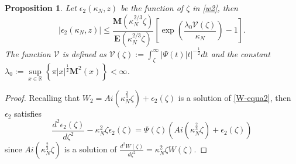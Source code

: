 \documentclass[11pt]{article}
\newtheorem{proposition}[theorem]{Proposition}
\numberwithin{equation}{section}%
\numberwithin{theorem}{section}
\begin{document}
\begin{proposition}\label{epsilon_2}
    Let $\epsilon_2(\kappa_N,z)$ be the function of $\zeta$ in \eqref{w2}, then
      \begin{equation}\label{B4e_2}
        |\epsilon_2(\kappa_N,z)|\le \frac{\mathbf{M}(\kappa_N^{2/3}\zeta)}{\mathbf{E}(\kappa_N^{2/3}\zeta)}\left[\exp\left(\frac{\lambda_0 \mathcal{V}(\zeta)}{\kappa_N}\right)-1\right].
    \end{equation}
The function $\mathcal{V}$ is defined as $\mathcal{V}(\zeta):=\int_\zeta^\infty|\Psi(t)|t|^{-\frac{1}{2}}dt$ and the constant $\lambda_0:=\sup\limits_{x\in \mathbb{R}}\left\{\pi|x|^\frac{1}{2}\mathbf{M}^2(x)\right\}<\infty$.
\end{proposition}
\begin{proof}
    Recalling that $W_2=Ai\left(\kappa_N^\frac{2}{3}\zeta\right)+\epsilon_2(\zeta)$ is a solution of \eqref{W-equa2}, then $\epsilon_2$ satisfies
    \begin{equation}\label{W-epsilon1}
        \frac{d^2\epsilon_2(\zeta)}{d\zeta^2}-\kappa_N^2\zeta\epsilon_2(\zeta)=\Psi(\zeta)\left(Ai\left(\kappa_N^\frac{2}{3}\zeta\right)+\epsilon_2(\zeta)\right)
    \end{equation}
    since $Ai\left(\kappa_N^\frac{2}{3}\zeta\right)$ is a solution of $\frac{d^2W(\zeta)}{d\zeta^2}=\kappa_N^2\zeta W(\zeta)$.
    

\end{proof}
\end{document}
